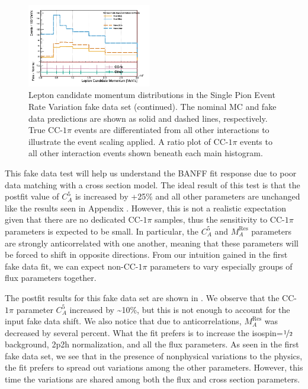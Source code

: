 \begin{figure}
\begin{centering}
{\begin{centering}
\includegraphics[width=0.48\textwidth]{Chapters/Figures/Validation/CA5Variation/NuMuRHCNTrks}
\par\end{centering}
}
\par\end{centering}
\caption[Lepton Candidate Momentum Distributions in the Single Pion Event Rate
Variation Fake Data Set (Continued)]{Lepton candidate momentum distributions in the Single Pion Event Rate
Variation fake data set (continued). The nominal MC and fake data
predictions are shown as solid and dashed lines, respectively. True
CC-$1\pi$ events are differentiated from all other interactions to
illustrate the event scaling applied. A ratio plot of CC-$1\pi$ events
to all other interaction events shown beneath each main histogram.
\label{fig:lepton-moentum-single-pion-fake-data-1}}
\end{figure}

This fake data test will help us understand the BANFF fit response
due to poor data matching with a cross section model. The ideal result
of this test is that the postfit value of $C_{A}^{5}$ is increased
by +25\% and all other parameters are unchanged like the results seen
in Appendix . However, this is not
a realistic expectation given that there are no dedicated CC-$1\pi$
samples, thus the sensitivity to CC-$1\pi$ parameters is expected
to be small. In particular, the $C_{A}^{5}$ and $M_{A}^{\text{Res}}$
parameters are strongly anticorrelated with one another, meaning that
these parameters will be forced to shift in opposite directions. From
our intuition gained in the first fake data fit, we can expect non-CC-$1\pi$
parameters to vary especially groups of flux parameters together.

The postfit results for this fake data set are shown in .
We observe that the CC-$1\pi$ parameter $C_{A}^{5}$ increased by
\textasciitilde 10\%, but this is not enough to account for the input
fake data shift. We also notice that due to anticorrelations, $M_{A}^{\text{Res}}$
was decreased by several percent. What the fit prefers is to increase
the isospin=$\nicefrac{1}{2}$ background, 2p2h normalization, and
all the flux parameters. As seen in the first fake data set, we see
that in the presence of nonphysical variations to the physics, the
fit prefers to spread out variations among the other parameters. However,
this time the variations are shared among both the flux and cross
section parameters.

